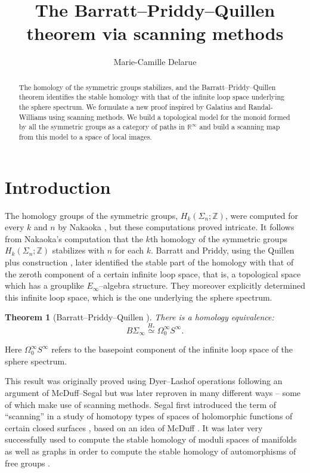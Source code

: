 \documentclass[12pt]{amsart}
\title{The Barratt--Priddy--Quillen theorem via scanning methods}
\author{Marie-Camille Delarue}
\theoremstyle{plain}
\newtheorem{teo}{Theorem}[section]
\theoremstyle{definition}
\theoremstyle{remark}
\begin{document}
\begin{abstract}
    The homology of the symmetric groups stabilizes, and the Barratt--Priddy--Quillen theorem identifies the stable homology with that of the infinite loop space underlying the sphere spectrum.
    We formulate a new proof inspired by Galatius and Randal-Williams using scanning methods.
    We build a topological model for the monoid formed by all the symmetric groups as a category of paths in $\mathbb{R}^\infty$ and build a scanning map from this model to a space of local images.
\end{abstract}

\maketitle
\tableofcontents

\section{Introduction}
The homology groups of the symmetric groups, $H_k(\Sigma_n;\mathbb{Z})$, were computed for every $k$ and $n$ by Nakaoka \cite{nakaoka}, but these computations proved intricate. 
It follows from Nakaoka's computation that the $k$th homology of the symmetric groups $H_k(\Sigma_n;\mathbb{Z})$ stabilizes with $n$ for each $k$. 
Barratt and Priddy, using the Quillen plus construction \cite{barrattpriddyone}, later identified the stable part of the homology with that of the zeroth component of a certain infinite loop space, that is, a topological space which has a grouplike $E_\infty$--algebra structure. 
They moreover explicitly determined this infinite loop space, which is the one underlying the sphere spectrum. 
\begin{teo}[Barratt--Priddy--Quillen \cite{barrattpriddytwo}]
There is a homology equivalence:
\[B\Sigma_\infty \overset{H_*}{\simeq} \Omega^\infty_0 S^\infty.\]
\end{teo}
Here $\Omega^\infty_0 S^\infty$ refers to the basepoint component of the infinite loop space of the sphere spectrum. 

This result was originally proved using Dyer--Lashof operations \cite{barrattpriddyone} following an argument of McDuff--Segal \cite{mcduffsegal} but was later reproven in many different ways -- some of which make use of scanning methods.
Segal first introduced the term of ``scanning'' in a study of homotopy types of spaces of holomorphic functions of certain closed surfaces \cite{segal79}, based on an idea of McDuff \cite{mcduff}.
It was later very successfully used to compute the stable homology of moduli spaces of manifolds \cite{madsenweiss, sorenrwModuliMonoids, gmtw} 
as well as graphs in order to compute the stable homology of automorphisms of free groups \cite{soren}. 
\end{document}
